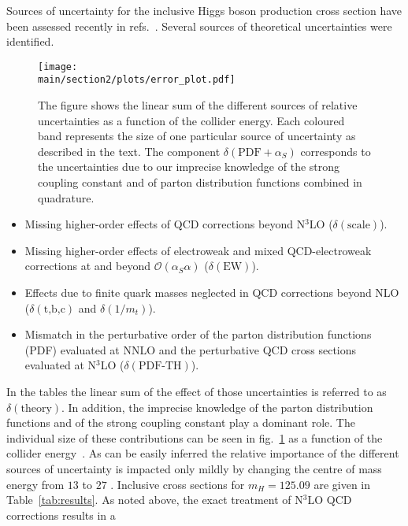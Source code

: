 Sources of uncertainty for the inclusive Higgs boson production cross section have been assessed recently in refs.~\cite{Anastasiou:2016cez,Harlander:2016hcx,Bonvini:2016frm,deFlorian:2016spz}. 
Several sources of theoretical uncertainties were identified.
\begin{figure}[h]
\begin{center}
    \texttt{[image: \\main/section2/plots/error\_plot.pdf]}
    \caption{
    The figure shows the linear sum of the different sources of relative uncertainties as a function of the collider energy. 
    Each coloured band represents the size of one particular source of uncertainty as described in the text.
    The component $\delta(\text{PDF}+\alpha_S)$ corresponds to the uncertainties due to our imprecise knowledge of the strong coupling constant and of parton distribution functions combined in quadrature.
        \label{fig:errorplot}}
        \end{center}
\end{figure}
\begin{itemize}
\item Missing higher-order effects of QCD corrections beyond N$^3$LO ($\delta(\text{scale})$).
\item Missing higher-order effects of electroweak and mixed QCD-electroweak corrections at and beyond $\mathcal{O}(\alpha_S \alpha)$ ($\delta(\text{EW})$).
\item Effects due to finite quark masses neglected in QCD corrections beyond NLO  ($\delta(\text{t,b,c})$ and $\delta(1/m_t)$).
\item Mismatch in the perturbative order of the parton distribution functions (PDF) evaluated at NNLO and the perturbative QCD cross sections evaluated at N$^3$LO ($\delta(\text{PDF-TH})$).
\end{itemize}
In the tables the linear sum of the effect of those uncertainties
is referred to as $\delta(\text{theory})$.  In addition, the imprecise
knowledge of the parton distribution functions and of the strong coupling
constant play a dominant role.  The individual size of these
contributions can be seen in fig.~\ref{fig:errorplot} as a function of
the collider energy~\cite{Dulat:2018rbf}.  As can be easily inferred
the relative importance of the different sources of uncertainty is
impacted only mildly by changing the centre of mass energy from $13$
\UTeV to $27$ \UTeV.  Inclusive cross sections for
$m_H=125.09$ \UGeV are given in Table~\ref{tab:results}. As noted above, the
exact treatment of N$^3$LO QCD corrections results in a
